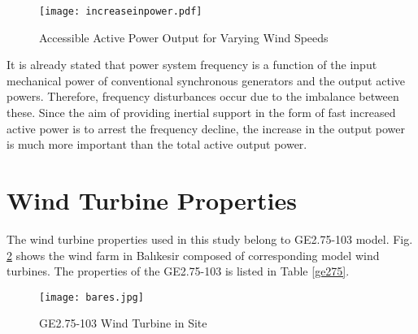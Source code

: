 \begin{figure}[h!]
	\centering
	\texttt{[image: increaseinpower.pdf]}
	\caption{Accessible Active Power Output for Varying Wind Speeds}
	\label{increase_active_power}
\end{figure}
It is already stated that power system frequency is a function of the input mechanical power of conventional synchronous generators and the output active powers. Therefore, frequency disturbances occur due to the imbalance between these. Since the aim of providing inertial support in the form of fast increased active power is to arrest the frequency decline, the increase in the output power is much more important than the total active output power. 
\section{Wind Turbine Properties}
The wind turbine properties used in this study belong to GE2.75-103 model. Fig. \ref{bares} shows the wind farm in Balıkesir composed of corresponding model wind turbines. The properties of the GE2.75-103 is listed in Table \ref{ge275}.
\begin{figure}[h]
	\centering
	\texttt{[image: bares.jpg]}
	\caption{GE2.75-103 Wind Turbine in Site}
	\label{bares}
\end{figure}
